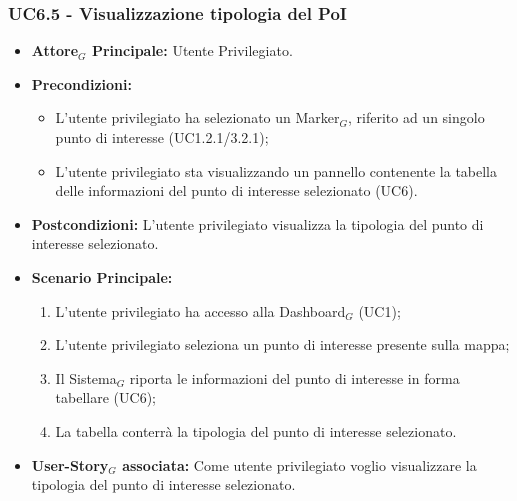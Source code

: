\documentclass[10pt]{article}
\begin{document}
\begin{justify}
 \subsubsection{\textbf{UC6.5 - Visualizzazione tipologia del PoI}}
 \begin{itemize}
     \item \textbf{Attore$_G$ Principale:} Utente Privilegiato.
     \item \textbf{Precondizioni:}
       \begin{itemize}
    	        \item L'utente privilegiato ha selezionato un Marker$_G$, riferito ad un singolo punto di interesse (UC1.2.1/3.2.1);
          \item L'utente privilegiato sta visualizzando un pannello contenente la tabella delle informazioni del punto di interesse selezionato (UC6).
       \end{itemize}
     \item \textbf{Postcondizioni:} L'utente privilegiato visualizza la tipologia del punto di interesse selezionato.
     \item \textbf{Scenario Principale:}
        \begin{enumerate}
            \item L'utente privilegiato ha accesso alla Dashboard$_G$ (UC1);
            \item L'utente privilegiato seleziona un punto di interesse presente sulla mappa;
            \item Il Sistema$_G$ riporta le informazioni del punto di interesse in forma tabellare (UC6);
            \item La tabella conterrà la tipologia del punto di interesse selezionato.
        \end{enumerate}
     \item \textbf{User-Story$_G$ associata:} Come utente privilegiato voglio visualizzare la tipologia del punto di interesse selezionato. 
 \end{itemize}

\end{justify}
\end{document}
